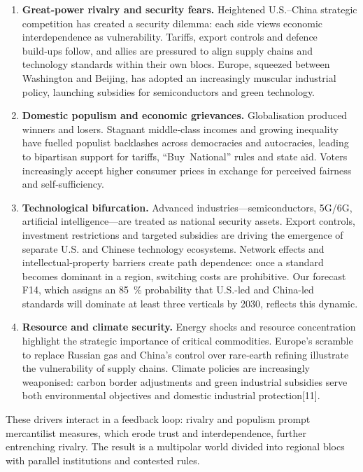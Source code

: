 \documentclass{article}
\begin{document}
\begin{enumerate}[label=\arabic*.]
\item \textbf{Great‑power rivalry and security fears.}  Heightened U.S.–China strategic competition has created a security dilemma: each side views economic interdependence as vulnerability.  Tariffs, export controls and defence build‑ups follow, and allies are pressured to align supply chains and technology standards within their own blocs.  Europe, squeezed between Washington and Beijing, has adopted an increasingly muscular industrial policy, launching subsidies for semiconductors and green technology.

\item \textbf{Domestic populism and economic grievances.}  Globalisation produced winners and losers.  Stagnant middle‑class incomes and growing inequality have fuelled populist backlashes across democracies and autocracies, leading to bipartisan support for tariffs, “Buy National” rules and state aid.  Voters increasingly accept higher consumer prices in exchange for perceived fairness and self‑sufficiency.

\item \textbf{Technological bifurcation.}  Advanced industries—semiconductors, 5G/6G, artificial intelligence—are treated as national security assets.  Export controls, investment restrictions and targeted subsidies are driving the emergence of separate U.S. and Chinese technology ecosystems.  Network effects and intellectual‑property barriers create path dependence: once a standard becomes dominant in a region, switching costs are prohibitive.  Our forecast F14, which assigns an 85 \% probability that U.S.-led and China-led standards will dominate at least three verticals by 2030, reflects this dynamic.

\item \textbf{Resource and climate security.}  Energy shocks and resource concentration highlight the strategic importance of critical commodities.  Europe’s scramble to replace Russian gas and China’s control over rare‑earth refining illustrate the vulnerability of supply chains.  Climate policies are increasingly weaponised: carbon border adjustments and green industrial subsidies serve both environmental objectives and domestic industrial protection[11].
\end{enumerate}

These drivers interact in a feedback loop: rivalry and populism prompt mercantilist measures, which erode trust and interdependence, further entrenching rivalry.  The result is a multipolar world divided into regional blocs with parallel institutions and contested rules.
\end{document}
